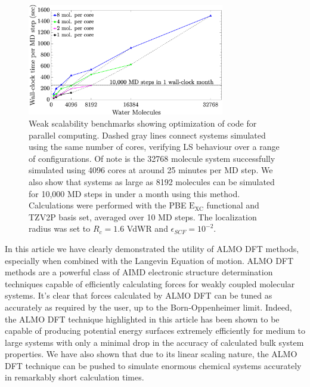 \documentclass[aps,prl,reprint,amsmath,amssymb]{revtex4-1}
\begin{document}
\begin{figure}
\includegraphics[trim={1.6cm 0cm 4.7cm 0cm},clip,width=8.6cm]{weakscaling.eps}
\caption{\label{fig:weakscaling} Weak scalability benchmarks showing optimization of code for parallel computing.
Dashed gray lines connect systems simulated using the same number of cores, verifying LS behaviour over a range of configurations.
Of note is the 32768 molecule system successfully simulated using 4096 cores at around 25 minutes per MD step.
We also show that systems as large as 8192 molecules can be simulated for 10,000 MD steps in under a month using this method.
Calculations were performed with the PBE $\mathrm{E_{XC}}$ functional and TZV2P basis set, averaged over 10 MD steps. 
The localization radius was set to $R_{c} = 1.6$ VdWR and $\epsilon_{SCF} = 10^{-2}$.}
\end{figure}


In this article we have clearly demonstrated the utility of ALMO DFT methods, especially when combined with the Langevin Equation of motion.
ALMO DFT methods are a powerful class of AIMD electronic structure determination techniques capable of efficiently calculating forces for weakly coupled molecular systems.
It's clear that forces calculated by ALMO DFT can be tuned as accurately as required by the user, up to the Born-Oppenheimer limit.
Indeed, the ALMO DFT technique highlighted in this article has been shown to be capable of producing potential energy surfaces extremely efficiently for medium to large systems with only a minimal drop in the accuracy of calculated bulk system properties.
We have also shown that due to its linear scaling nature, the ALMO DFT technique can be pushed to simulate enormous chemical systems accurately in remarkably short calculation times.
\end{document}
